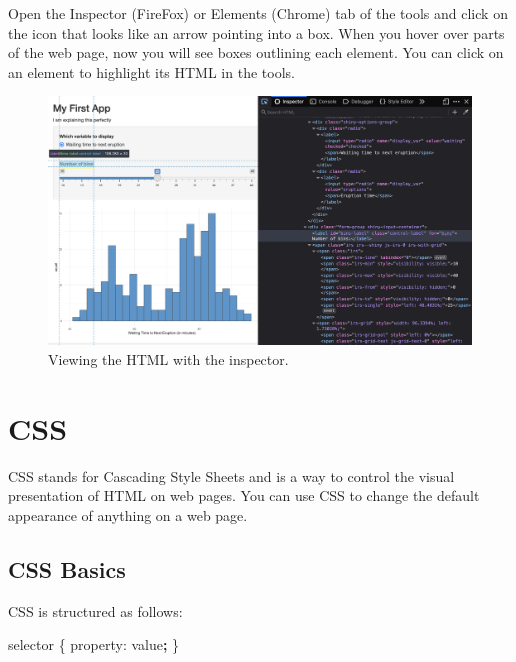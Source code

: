 \documentclass[
  oneside]{book}
\newenvironment{Shaded}{\begin{snugshade}}{\end{snugshade}}
\newcommand{\NormalTok}[1]{#1}
\newcommand{\OperatorTok}[1]{\textcolor[rgb]{0.81,0.36,0.00}{\textbf{#1}}}
\begin{document}
Open the Inspector (FireFox) or Elements (Chrome) tab of the tools and click on the icon that looks like an arrow pointing into a box. When you hover over parts of the web page, now you will see boxes outlining each element. You can click on an element to highlight its HTML in the tools.

\begin{figure}

{\centering \includegraphics[width=1\linewidth]{images/inspector} 

}

\caption{Viewing the HTML with the inspector.}\label{fig:inspector}
\end{figure}

\hypertarget{CSS}{%
\section{CSS}\label{CSS}}

CSS stands for Cascading Style Sheets and is a way to control the visual presentation of HTML on web pages. You can use CSS to change the default appearance of anything on a web page.

\hypertarget{css-basics}{%
\subsection{CSS Basics}\label{css-basics}}

CSS is structured as follows:

\begin{Shaded}
\begin{Highlighting}[]
\NormalTok{selector \{ property: value}\OperatorTok{;}\NormalTok{ \}}
\end{Highlighting}
\end{Shaded}
\end{document}
